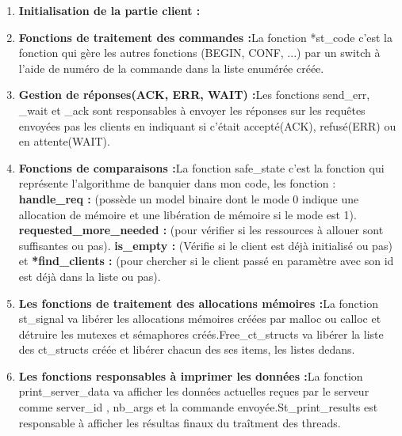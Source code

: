 \documentclass{article}
\begin{document}
\begin{itemize}
\begin{enumerate}
\item \textbf{Initialisation de la partie client :}\newline
\item \textbf{Fonctions de traitement des commandes :}\newline La fonction *st\_code c'est la fonction qui gère les autres fonctions (BEGIN, CONF, ...) par un switch à l'aide de numéro de la commande dans la liste enumérée créée. 
\item \textbf{Gestion de réponses(ACK, ERR, WAIT) :}\newline Les fonctions send\_err, \_wait et \_ack sont responsables à envoyer les réponses sur les requêtes envoyées pas les clients en indiquant si c'était accepté(ACK), refusé(ERR) ou en attente(WAIT).
\item \textbf{Fonctions de comparaisons :}\newline La fonction safe\_state c'est la fonction qui représente l'algorithme de banquier dans mon code, les fonction : \textbf{handle\_req : }(possède un model binaire dont le mode 0 indique une allocation de mémoire et une libération de mémoire si le mode est 1). \textbf{requested\_more\_needed : }(pour vérifier si les ressources à allouer sont suffisantes ou pas). \textbf{is\_empty : }(Vérifie si le client est déjà initialisé ou pas) et \textbf{*find\_clients : }(pour chercher si le client passé en paramètre avec son id est déjà dans la liste ou pas).\newline   
\item \textbf{Les fonctions de traitement des allocations mémoires :}\newline La fonction st\_signal va libérer les allocations mémoires créées par malloc ou calloc et détruire les mutexes et sémaphores créés.\newline Free\_ct\_structs va libérer la liste des ct\_structs créée et libérer chacun des ses items, les listes dedans.
\item \textbf{Les fonctions responsables à imprimer les données :}\newline La fonction print\_server\_data va afficher les données actuelles reçues par le serveur comme server\_id , nb\_args et la commande envoyée.\newline St\_print\_results est responsable à afficher les résultas finaux du traîtment des threads.
\end{enumerate}
\end{itemize} 
\end{document}
